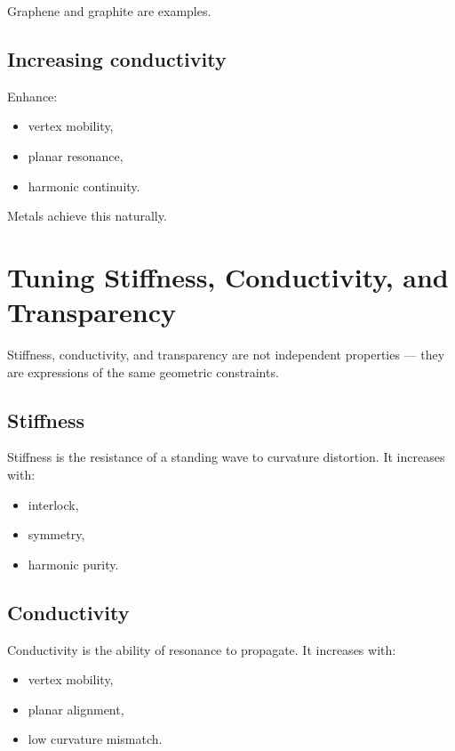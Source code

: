 \documentclass[11pt, letterpaper, openany]{book}
\begin{document}
Graphene and graphite are examples.

\subsection*{Increasing conductivity}

Enhance:

\begin{itemize}
    \item vertex mobility,
    \item planar resonance,
    \item harmonic continuity.
\end{itemize}

Metals achieve this naturally.

\section{Tuning Stiffness, Conductivity, and Transparency}

Stiffness, conductivity, and transparency are not independent properties — they are
expressions of the same geometric constraints.

\subsection*{Stiffness}

Stiffness is the resistance of a standing wave to curvature distortion. It increases with:

\begin{itemize}
    \item interlock,
    \item symmetry,
    \item harmonic purity.
\end{itemize}

\subsection*{Conductivity}

Conductivity is the ability of resonance to propagate. It increases with:

\begin{itemize}
    \item vertex mobility,
    \item planar alignment,
    \item low curvature mismatch.
\end{itemize}
\end{document}
